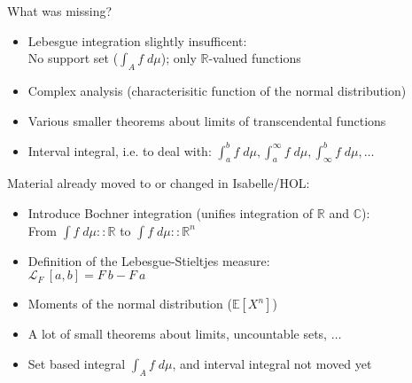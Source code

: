 \documentclass[usepdftitle=false]{beamer}
\begin{document}
\begin{frame}

What was missing?

\begin{itemize}
\item Lebesgue integration slightly insufficent: \\
  No support set ($\int_A f\;d\mu$); only $\mathbb{R}$-valued functions
\pause
\item Complex analysis (characterisitic function of the normal distribution)
\pause

\item Various smaller theorems about limits of transcendental functions
\pause

\item Interval integral, i.e. to deal with: $\int_{a}^b f\; d\mu, \int_{a}^\infty f\; d\mu, \int_{\infty}^b f\; d\mu, \ldots$

\end{itemize}

\pause

Material already moved to or changed in Isabelle/HOL:

\begin{itemize}

\item Introduce Bochner integration (unifies integration of $\mathbb{R}$ and $\mathbb{C}$): \\
  From $\int {f}\; d\!\mu :: \mathbb{R}$ to $\int {f}\; d\!\mu :: \mathbb{R}^n$

\pause

\item Definition of the Lebesgue-Stieltjes measure: \\ 
  $\mathcal{L}_F~[a, b] = F~b - F~a$

\pause

\item Moments of the normal distribution ($\mathbb{E}[X^n]$)

\pause

\item A lot of small theorems about limits, uncountable sets, $\dots$

\pause

\item Set based integral $\int_A f\;d\mu$, and interval integral not moved yet

\end{itemize}

\end{frame}
\end{document}
